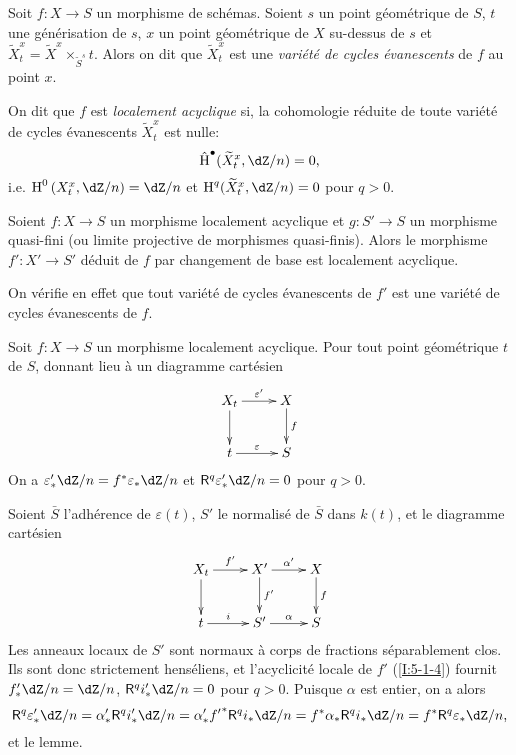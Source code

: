 \begin{definition}\label{I:5-1-3}
Soit $f:X\to S$ un morphisme de schémas. Soient $s$ un point géométrique de 
$S$, $t$ une générisation de $s$, $x$ un point géométrique de $X$ 
su-dessus de $s$ et 
$\widetilde X_t^x = \widetilde X^x\times_{\widetilde S^s} t$. Alors on dit que 
$\widetilde X_t^x$ est une \emph{variété de cycles évanescents} de $f$ au 
point $x$. 

On dit que $f$ est \emph{localement acyclique} si, la cohomologie réduite de 
toute variété de cycles évanescents $\widetilde X_t^x$ est nulle:
\begin{equation}\label{I:eq:5-1-3-1}
  \hat\h^\bullet(\widetilde X_t^x,\dZ/n) = 0\text{,}
\end{equation}
i.e. $\h^0\left(X_t^x,\dZ/n\right) = \dZ/n$ et 
$\h^q(\widetilde X_t^x,\dZ/n) = 0$ pour $q>0$. 
\end{definition}





\begin{lemma}\label{I:5-1-4}
Soient $f:X\to S$ un morphisme localement acyclique et $g:S'\to S$ un morphisme 
quasi-fini (ou limite projective de morphismes quasi-finis). Alors le 
morphisme $f':X'\to S'$ déduit de $f$ par changement de base est localement 
acyclique.
\end{lemma}

On vérifie en effet que tout variété de cycles évanescents de $f'$ est 
une variété de cycles évanescents de $f$.  	





\begin{lemma}\label{I:5-1-5}
Soit $f:X\to S$ un morphisme localement acyclique. Pour tout point géométrique 
$t$ de $S$, donnant lieu à un diagramme cartésien 
\[\xymatrix{
  X_t \ar[r]^-{\varepsilon'} \ar[d] 
    & X \ar[d]^-f \\
  t \ar[r]^-\varepsilon 
    & S
}\]
On a $\varepsilon_*' \dZ/n = f^*\varepsilon_* \dZ/n$ et $\R^q \varepsilon_*'\dZ/n=0$ 
pour $q>0$. 
\end{lemma}

Soient $\bar S$ l'adhérence de $\varepsilon(t)$, $S'$ le normalisé de $\bar S$ 
dans $k(t)$, et le diagramme cartésien 
\[\xymatrix{
  X_t \ar[r]^-{f'} \ar[d] 
    & X' \ar[r]^-{\alpha'} \ar[d]^-{f'} 
    & X \ar[d]^-f \\
  t \ar[r]^-i 
    & S' \ar[r]^-\alpha 
    & S
}\]
Les anneaux locaux de $S'$ sont normaux à corps de fractions séparablement 
clos. Ils sont donc strictement henséliens, et l'acyclicité locale de $f'$ 
(\ref{I:5-1-4}) fournit $f_*'\dZ/n = \dZ/n$, $\R^qi_*'\dZ/n = 0$ pour $q>0$. 
Puisque $\alpha$ est entier, on a alors 
\[
  \R^q\varepsilon_*'\dZ/n 
    = \alpha_*' \R^q i_*' \dZ/n 
    = \alpha_*' {f'}^* \R^q i_* \dZ/n 
    = f^* \alpha_* \R^q i_* \dZ/n 
    = f^* \R^q \varepsilon_* \dZ/n \text{,}
\]
et le lemme. 





